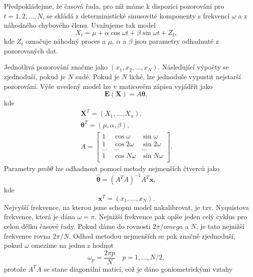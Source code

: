 Předpokládejme, že časová řada, pro níž máme k dispozici pozorování pro $t = 1, 2, ..., N$, se skládá z deterministické sinusovité komponenty s frekvencí $\omega$ a z náhodného chybového členu. Uvažujeme tak model
\begin{equation}
X_t = \mu + \alpha \cos \omega t + \beta \sin \omega t + Z_t,
\end{equation}
kde $Z_t$ označuje náhodný proces a $\mu$, $\alpha$ a $\beta$ jsou parametry odhadnuté z pozorovaných dat.

Jednotlivá pozorování značme jako $(x_1, x_2, ..., x_N)$. Následující výpočty se zjednoduší, pokud je $N$ sudé. Pokud je $N$ liché, lze jednoduše vypustit nejstarší pozorování. Výše uvedený model lze v maticovém zápisu vyjádřit jako
\begin{equation}
\pmb{E}(\pmb{X}) = A \pmb{\theta},
\end{equation}
kde
\begin{align}
\pmb{X}^T = (X_1, ..., X_n), \nonumber \\
\pmb{\theta}^T = (\mu, \alpha, \beta),\\
A =
\begin{bmatrix}
1 & \cos \omega & \sin \omega\\
1 & \cos 2 \omega & \sin 2 \omega\\
... & ... & ...\\
1 & \cos N \omega & \sin N \omega\\
\end{bmatrix}. \nonumber
\end{align}
Parametry $pmb{\theta}$ lze odhadnout pomocí metody nejmenších čtverců jako
\begin{equation}
\hat{\pmb{\theta}} = (A^T A)^{-1} A^T \pmb{x},
\end{equation}
kde
\begin{equation}
\pmb{x}^T = (x_1, ..., x_N).
\end{equation}
Nejvyšší frekvence, na kterou jsme schopni model nakalibrovat, je tzv. Nyquistova frekvence, která je dána $\omega = \pi$. Nejnižší frekvence pak opíše jeden celý cyklus pro celou délku časové řady. Pokud dáme do rovnosti $2\pi / omega$ a $N$, je tato nejnižší frekvence rovna $2\pi / N$. Odhad metodou nejmenších se pak značně zjednoduší, pokud $\omega$ omezíme na jednu z hodnot
\begin{equation}
\omega_p = \frac{2 \pi p}{N} \quad p = 1, ..., N/2,
\end{equation}
protože $A^T A$ se stane diagonální maticí, což je dáno goniometrickými vztahy
